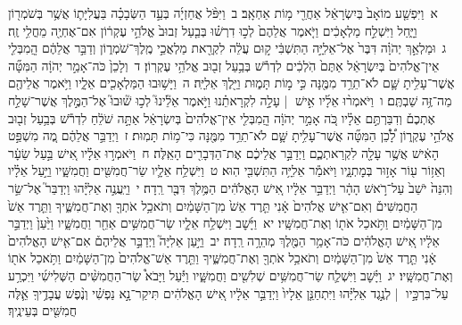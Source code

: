 \documentclass[18pt]{article}
\begin{document}
\startlock
 {\loc א~}וַיִּפְשַׁ֤ע מוֹאָב֙ בְּיִשְׂרָאֵ֔ל אַחֲרֵ֖י מ֥וֹת אַחְאָֽב׃ \startlock
 {\loc ב~}וַיִּפֹּ֨ל אֲחַזְיָ֜ה בְּעַ֣ד הַשְּׂבָכָ֗ה בַּעֲלִיָּת֛וֹ אֲשֶׁ֥ר בְּשֹׁמְר֖וֹן וַיָּ֑חַל וַיִּשְׁלַ֣ח מַלְאָכִ֔ים וַיֹּ֤אמֶר אֲלֵהֶם֙ לְכ֣וּ דִרְשׁ֗וּ בְּבַ֤עַל זְבוּב֙ אֱלֹהֵ֣י עֶקְר֔וֹן אִם־אֶחְיֶ֖ה מֵחֳלִ֥י זֶֽה׃ \startlock
 {\loc ג~}וּמַלְאַ֣ךְ יְהֹוָ֗ה דִּבֶּר֙ אֶל־אֵלִיָּ֣ה הַתִּשְׁבִּ֔י ק֣וּם עֲלֵ֔ה לִקְרַ֖את מַלְאֲכֵ֣י מֶֽלֶךְ־שֹׁמְר֑וֹן וְדַבֵּ֣ר אֲלֵהֶ֔ם הֲֽמִבְּלִ֤י אֵין־אֱלֹהִים֙ בְּיִשְׂרָאֵ֔ל אַתֶּם֙ הֹֽלְכִ֔ים לִדְרֹ֕שׁ בְּבַ֥עַל זְב֖וּב אֱלֹהֵ֥י עֶקְרֽוֹן׃ \startlock
 {\loc ד~}וְלָכֵן֙ כֹּה־אָמַ֣ר יְהֹוָ֔ה הַמִּטָּ֞ה אֲשֶׁר־עָלִ֥יתָ שָּׁ֛ם לֹא־תֵרֵ֥ד מִמֶּ֖נָּה כִּ֣י מ֣וֹת תָּמ֑וּת וַיֵּ֖לֶךְ אֵלִיָּֽה׃ \startlock
 {\loc ה~}וַיָּשׁ֥וּבוּ הַמַּלְאָכִ֖ים אֵלָ֑יו וַיֹּ֥אמֶר אֲלֵיהֶ֖ם מַה־זֶּ֥ה שַׁבְתֶּֽם׃ \startlock
 {\loc ו~}וַיֹּאמְר֨וּ אֵלָ֜יו אִ֣ישׁ  |  עָלָ֣ה לִקְרָאתֵ֗נוּ וַיֹּ֣אמֶר אֵלֵ֘ינוּ֮ לְכ֣וּ שׁ֘וּבוּ֮ אֶל־הַמֶּ֣לֶךְ אֲשֶׁר־שָׁלַ֣ח אֶתְכֶם֒ וְדִבַּרְתֶּ֣ם אֵלָ֗יו כֹּ֚ה אָמַ֣ר יְהֹוָ֔ה הֲֽמִבְּלִ֤י אֵין־אֱלֹהִים֙ בְּיִשְׂרָאֵ֔ל אַתָּ֣ה שֹׁלֵ֔חַ לִדְרֹ֕שׁ בְּבַ֥עַל זְב֖וּב אֱלֹהֵ֣י עֶקְר֑וֹן לָ֠כֵ֠ן הַמִּטָּ֞ה אֲשֶׁר־עָלִ֥יתָ שָּׁ֛ם לֹא־תֵרֵ֥ד מִמֶּ֖נָּה כִּי־מ֥וֹת תָּמֽוּת׃ \startlock
 {\loc ז~}וַיְדַבֵּ֣ר אֲלֵהֶ֔ם מֶ֚ה מִשְׁפַּ֣ט הָאִ֔ישׁ אֲשֶׁ֥ר עָלָ֖ה לִקְרַאתְכֶ֑ם וַיְדַבֵּ֣ר אֲלֵיכֶ֔ם אֶת־הַדְּבָרִ֖ים הָאֵֽלֶּה׃ \startlock
 {\loc ח~}וַיֹּאמְר֣וּ אֵלָ֗יו אִ֚ישׁ בַּ֣עַל שֵׂעָ֔ר וְאֵז֥וֹר ע֖וֹר אָז֣וּר בְּמׇתְנָ֑יו וַיֹּאמַ֕ר אֵלִיָּ֥ה הַתִּשְׁבִּ֖י הֽוּא׃ \startlock
 {\loc ט~}וַיִּשְׁלַ֥ח אֵלָ֛יו שַׂר־חֲמִשִּׁ֖ים וַחֲמִשָּׁ֑יו וַיַּ֣עַל אֵלָ֗יו וְהִנֵּה֙ יֹשֵׁב֙ עַל־רֹ֣אשׁ הָהָ֔ר וַיְדַבֵּ֣ר אֵלָ֔יו אִ֚ישׁ הָאֱלֹהִ֔ים הַמֶּ֥לֶךְ דִּבֶּ֖ר רֵֽדָה׃ \startlock
 {\loc י~}וַיַּֽעֲנֶ֣ה אֵלִיָּ֗הוּ וַיְדַבֵּר֮ אֶל־שַׂ֣ר הַחֲמִשִּׁים֒ וְאִם־אִ֤ישׁ אֱלֹהִים֙ אָ֔נִי תֵּ֤רֶד אֵשׁ֙ מִן־הַשָּׁמַ֔יִם וְתֹאכַ֥ל אֹתְךָ֖ וְאֶת־חֲמִשֶּׁ֑יךָ וַתֵּ֤רֶד אֵשׁ֙ מִן־הַשָּׁמַ֔יִם וַתֹּ֥אכַל אֹת֖וֹ וְאֶת־חֲמִשָּֽׁיו׃ \startlock
 {\loc יא~}וַיָּ֜שׇׁב וַיִּשְׁלַ֥ח אֵלָ֛יו שַׂר־חֲמִשִּׁ֥ים אַחֵ֖ר וַחֲמִשָּׁ֑יו וַיַּ֙עַן֙ וַיְדַבֵּ֣ר אֵלָ֔יו אִ֚ישׁ הָאֱלֹהִ֔ים כֹּה־אָמַ֥ר הַמֶּ֖לֶךְ מְהֵרָ֥ה רֵֽדָה׃ \startlock
 {\loc יב~}וַיַּ֣עַן אֵלִיָּה֮ וַיְדַבֵּ֣ר אֲלֵיהֶם֒ אִם־אִ֤ישׁ הָאֱלֹהִים֙ אָ֔נִי תֵּ֤רֶד אֵשׁ֙ מִן־הַשָּׁמַ֔יִם וְתֹאכַ֥ל אֹתְךָ֖ וְאֶת־חֲמִשֶּׁ֑יךָ וַתֵּ֤רֶד אֵשׁ־אֱלֹהִים֙ מִן־הַשָּׁמַ֔יִם וַתֹּ֥אכַל אֹת֖וֹ וְאֶת־חֲמִשָּֽׁיו׃ \startlock
 {\loc יג~}וַיָּ֗שׇׁב וַיִּשְׁלַ֛ח שַׂר־חֲמִשִּׁ֥ים שְׁלִשִׁ֖ים וַחֲמִשָּׁ֑יו וַיַּ֡עַל וַיָּבֹא֩ שַׂר־הַחֲמִשִּׁ֨ים הַשְּׁלִישִׁ֜י וַיִּכְרַ֥ע עַל־בִּרְכָּ֣יו  |  לְנֶ֣גֶד אֵלִיָּ֗הוּ וַיִּתְחַנֵּ֤ן אֵלָיו֙ וַיְדַבֵּ֣ר אֵלָ֔יו אִ֚ישׁ הָאֱלֹהִ֔ים תִּיקַר־נָ֣א נַפְשִׁ֗י וְנֶ֨פֶשׁ עֲבָדֶ֥יךָֽ אֵ֛לֶּה חֲמִשִּׁ֖ים בְּעֵינֶֽיךָ׃ \startlock
\end{document}
